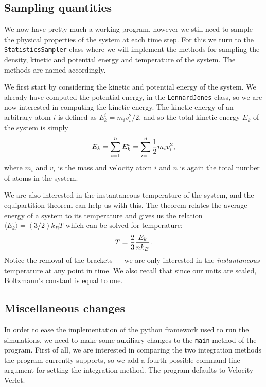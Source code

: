 \documentclass[a4paper]{article}
\begin{document}
    \subsection{Sampling quantities}
    \label{sub:sampling_quantities}
   
    We now have pretty much a working program, however we still need to sample
    the physical properties of the system at each time step. For this we turn
    to the \texttt{StatisticsSampler}-class where we will implement the methods
    for sampling the density, kinetic and potential energy and temperature of
    the system. The methods are named accordingly.
    
    We first start by considering the kinetic and potential energy of the
    system. We already have computed the potential energy, in the
    \texttt{LennardJones}-class, so we are now interested in computing the
    kinetic energy. The kinetic energy of an arbitrary atom $i$ is defined as
    $E_{k}^i = m_iv_i^2/2$, and so the total kinetic energy $E_k$ of the system
    is simply
    \begin{equation}
        \notag
        E_k = \sum^{n}_{i=1} E_k^i = \sum^{n}_{i=1} \frac{1}{2}m_iv_i^2,
    \end{equation}
    where $m_i$ and $v_i$ is the mass and velocity atom $i$ and $n$ is again
    the total number of atoms in the system.
    
    We are also interested in the instantaneous temperature of the system, and
    the equipartition theorem \cite{equipar} can help us with this. The theorem
    relates the average energy of a system to its temperature and gives us the
    relation $\langle E_k \rangle = (3/2)k_BT$ which can be solved for
    temperature:
    \begin{equation}
        \notag
        T = \frac{2}{3} \frac{E_k}{nk_B}.
    \end{equation}
    Notice the removal of the brackets --- we are only interested in the
    \emph{instantaneous} temperature at any point in time. We also recall that
    since our units are scaled, Boltzmann's constant is equal to one.
    
    \subsection{Miscellaneous changes}
    \label{sub:miscellaneous_changes}
    
    In order to ease the implementation of the python framework used to run the
    simulations, we need to make some auxiliary changes to the
    \texttt{main}-method of the program. First of all, we are interested in
    comparing the two integration methods the program currently supports, so we
    add a fourth possible command line argument for setting the integration
    method. The program defaults to Velocity-Verlet.  
    
\end{document}
